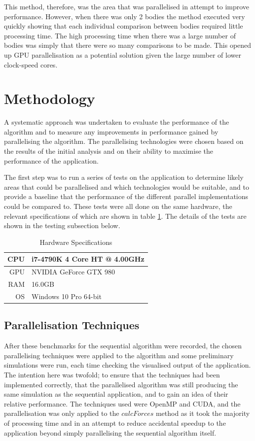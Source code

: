 \documentclass[12pt,journal,transmag]{IEEEtran}
\begin{document}
	This method, therefore, was the area that was parallelised in attempt to improve performance. However, when there was only 2 bodies the method executed very quickly showing that each individual comparison between bodies required little processing time. The high processing time when there was a large number of bodies was simply that there were so many comparisons to be made. This opened up GPU parallelisation as a potential solution given the large number of lower clock-speed cores.
	
	\section{Methodology}
	
	A systematic approach was undertaken to evaluate the performance of the algorithm and to measure any improvements in performance gained by parallelising the algorithm. The parallelising technologies were chosen based on the results of the initial analysis and on their ability to maximise the performance of the application.
	
	The first step was to run a series of tests on the application to determine likely areas that could be parallelised and which technologies would be suitable, and to provide a baseline that the performance of the different parallel implementations could be compared to. These tests were all done on the same hardware, the relevant specifications of which are shown in table \ref{hardware}. The details of the tests are shown in the testing subsection below.
	
	\begin{table}[!h]
		\renewcommand{\arraystretch}{1.3}
		\caption{Hardware Specifications}
		\label{hardware}
		\centering
		\begin{tabular}{r|l}
			\toprule
			CPU & i7-4790K 4 Core HT @ 4.00GHz\\ \hline
			GPU & NVIDIA GeForce GTX 980 \\ \hline
			RAM & 16.0GB\\ \hline
			OS & Windows 10 Pro 64-bit\\ \bottomrule
		\end{tabular}
	\end{table}
	
	\subsection{Parallelisation Techniques}
	After these benchmarks for the sequential algorithm were recorded, the chosen parallelising techniques were applied to the algorithm and some preliminary simulations were run, each time checking the visualised output of the application. The intention here was twofold; to ensure that the techniques had been implemented correctly, that the parallelised algorithm was still producing the same simulation as the sequential application, and to gain an idea of their relative performance. The techniques used were OpenMP and CUDA, and the parallelisation was only applied to the $calcForces$ method as it took the majority of processing time and in an attempt to reduce accidental speedup to the application beyond simply parallelising the sequential algorithm itself.
	
\end{document}
